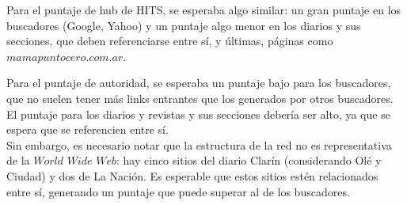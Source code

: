 \documentclass[a4paper]{article}
\begin{document}
Para el puntaje de hub de HITS, se esperaba algo similar: un gran puntaje en los buscadores (Google, Yahoo) y un puntaje algo menor en los diarios y sus secciones, que deben referenciarse entre sí, y últimas, páginas como $mamapuntocero.com.ar$.

Para el puntaje de autoridad, se esperaba un puntaje bajo para los buscadores, que no suelen tener más links entrantes que los generados por otros buscadores. El puntaje para los diarios y revistas y sus secciones debería ser alto, ya que se espera que se referencien entre sí.\\

Sin embargo, es necesario notar que la estructura de la red no es representativa de la $World$ $Wide$ $Web$: hay cinco sitios del diario Clarín (considerando Olé y Ciudad) y dos de La Nación. Es esperable que estos sitios estén relacionados entre sí, generando un puntaje que puede superar al de los buscadores.
\end{document}
